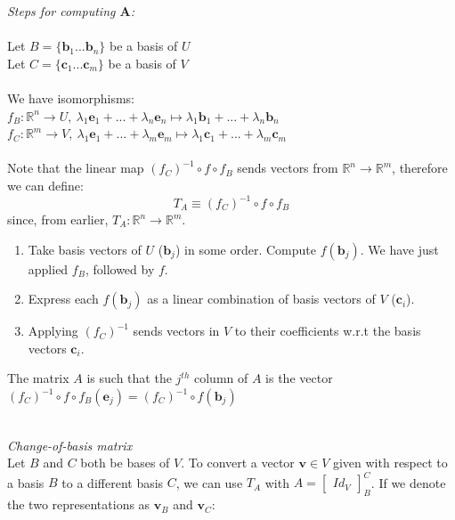 \documentclass{article}
\newcommand{\R}{\mathbb{R}}
\renewcommand{\vec}[1]{\mathbf{#1}}
\begin{document}
\begin{tcolorbox}[breakable]
\textit{Steps for computing $ \vec{A} $:}
\\\\
Let $ B = \{\vec{b}_{1}...\vec{b}_{n}\} $ be a basis of $ U $
\\
Let $ C = \{\vec{c}_{1}...\vec{c}_{m}\} $ be a basis of $ V $
\\\\
We have isomorphisms:
\\
$ f_{B} : \R^{n} \to U, \ \lambda_{1}\vec{e}_{1} + ... + \lambda_{n}\vec{e}_{n} \mapsto \lambda_{1}\vec{b}_{1} + ... + \lambda_{n}\vec{b}_{n} $
\\
$ f_{C} : \R^{m} \to V, \ \lambda_{1}\vec{e}_{1} + ... + \lambda_{m}\vec{e}_{m} \mapsto \lambda_{1}\vec{c}_{1} + ... + \lambda_{m}\vec{c}_{m} $
\\\\
Note that the linear map $ (f_{C})^{-1} \circ f \circ f_{B} $ sends vectors from $ \R^{n} \to \R^{m} $, therefore we can define:
\begin{equation}
T_{A} \equiv (f_{C})^{-1} \circ f \circ f_{B}
\end{equation}
since, from earlier, $ T_{A} : \R^{n} \to \R^{m} $.
\begin{enumerate}[leftmargin=*]
\item Take basis vectors of $ U $ ($ \vec{b}_{j} $) in some order. Compute $ f(\vec{b}_{j}) $. We have just applied $ f_{B} $, followed by $ f $.
\item Express each $ f(\vec{b}_{j}) $ as a linear combination of basis vectors of $ V $ ($ \vec{c}_{i} $).
\item Applying $ (f_{C})^{-1} $ sends vectors in $ V $ to their coefficients w.r.t the basis vectors $ \vec{c}_{i} $.
\end{enumerate}
The matrix $ A $ is such that the $ j^{th} $ column of $ A $ is the vector $ (f_{C})^{-1} \circ f \circ f_{B}(\vec{e}_{j})  = (f_{C})^{-1} \circ f(\vec{b}_{j}) $
\end{tcolorbox}
\noindent
\\
\textit{Change-of-basis matrix}
\\
Let $ B $ and $ C $ both be bases of $ V $. To convert a vector $ \vec{v} \in V $ given with respect to a basis $ B $ to a different basis $ C $, we can use $ T_{A} $ with $ A = 
\begin{bmatrix}
Id_{V}
\end{bmatrix}_{B}^{C} $. If we denote the two representations as $ \vec{v}_{B} $ and $ \vec{v}_{C} $:
\end{document}
